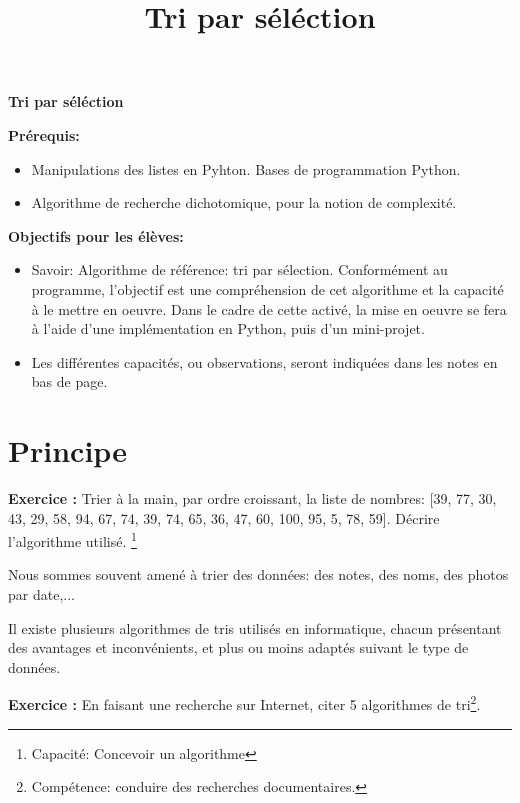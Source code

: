 \documentclass{article}
\title{Tri par séléction}
\newcounter{exo}
\newcommand{\exercice}{
\stepcounter{exo}
\noindent\textbf{Exercice \theexo :}
}
\begin{document}
\renewcommand \footrulewidth{.2pt}%
\pagestyle{fancy}
\begin{center}
	\Large\textbf{Tri par séléction}
\end{center}
\textbf{Prérequis:}
\begin{itemize}
\setlength{\itemsep}{1pt}
     \setlength{\parskip}{0pt}
     \setlength{\parsep}{0pt}
	\item Manipulations des listes en Pyhton. Bases de programmation Python.
	\item Algorithme de recherche dichotomique, pour la notion de complexité.
\end{itemize}
\textbf{Objectifs pour les élèves:}
\begin{itemize}
\setlength{\itemsep}{1pt}
     \setlength{\parskip}{0pt}
     \setlength{\parsep}{0pt}
	\item Savoir: Algorithme de référence: tri par sélection.\newline
	Conformément au programme, l'objectif est une compréhension de cet algorithme et la capacité à le mettre en oeuvre. Dans le cadre de cette activé, la mise en oeuvre se fera à l'aide d'une implémentation en Python, puis d'un mini-projet.
	\item Les différentes capacités, ou observations, seront indiquées dans les notes en bas de page.
\end{itemize}
\section{Principe}
\exercice Trier à la main, par ordre croissant, la liste de nombres: [39, 77, 30, 43, 29, 58, 94, 67, 74, 39, 74, 65, 36, 47, 60, 100, 95, 5, 78, 59]. Décrire l'algorithme utilisé. \footnote{Capacité: Concevoir un algorithme}

\smallskip

Nous sommes souvent amené à trier des données: des notes, des noms, des photos par date,...

Il existe plusieurs algorithmes de tris utilisés en informatique, chacun présentant des avantages et inconvénients, et plus ou moins adaptés suivant le type de données.

\exercice En faisant une recherche sur Internet, citer 5 algorithmes de tri\footnote{Compétence: conduire des recherches documentaires.}.
\end{document}
